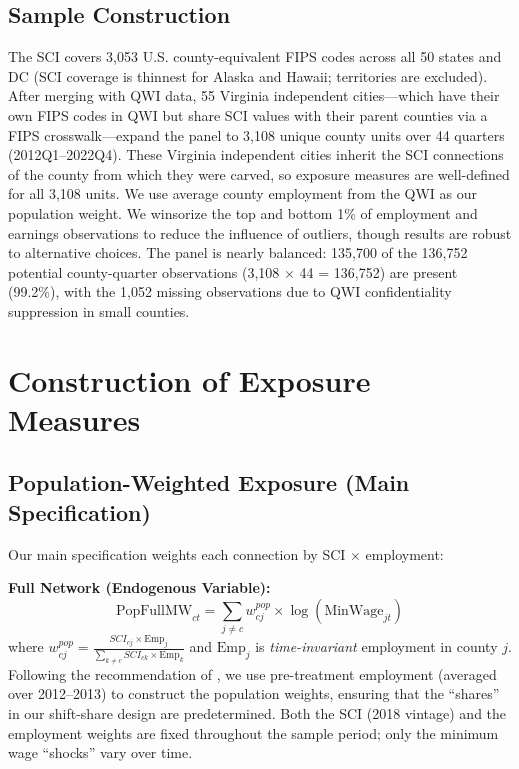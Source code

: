 \documentclass[12pt]{article}
\begin{document}
\subsection{Sample Construction}

The SCI covers 3,053 U.S. county-equivalent FIPS codes across all 50 states and DC (SCI coverage is thinnest for Alaska and Hawaii; territories are excluded). After merging with QWI data, 55 Virginia independent cities---which have their own FIPS codes in QWI but share SCI values with their parent counties via a FIPS crosswalk---expand the panel to 3,108 unique county units over 44 quarters (2012Q1--2022Q4). These Virginia independent cities inherit the SCI connections of the county from which they were carved, so exposure measures are well-defined for all 3,108 units. We use average county employment from the QWI as our population weight. We winsorize the top and bottom 1\% of employment and earnings observations to reduce the influence of outliers, though results are robust to alternative choices. The panel is nearly balanced: 135,700 of the 136,752 potential county-quarter observations (3,108 $\times$ 44 = 136,752) are present (99.2\%), with the 1,052 missing observations due to QWI confidentiality suppression in small counties.


\section{Construction of Exposure Measures}
\label{sec:construction}

\subsection{Population-Weighted Exposure (Main Specification)}

Our main specification weights each connection by SCI $\times$ employment:

\textbf{Full Network (Endogenous Variable):}
\begin{equation}
\text{PopFullMW}_{ct} = \sum_{j \neq c} w^{pop}_{cj} \times \log(\text{MinWage}_{jt})
\end{equation}
where $w^{pop}_{cj} = \frac{SCI_{cj} \times \text{Emp}_j}{\sum_{k \neq c} SCI_{ck} \times \text{Emp}_k}$ and $\text{Emp}_j$ is \textit{time-invariant} employment in county $j$. Following the recommendation of \citet{borusyak2022quasi}, we use pre-treatment employment (averaged over 2012--2013) to construct the population weights, ensuring that the ``shares'' in our shift-share design are predetermined. Both the SCI (2018 vintage) and the employment weights are fixed throughout the sample period; only the minimum wage ``shocks'' vary over time.
\end{document}
